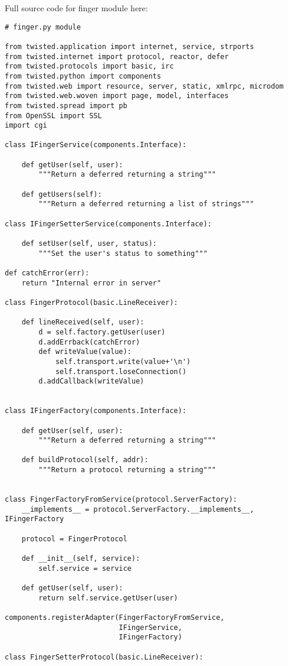  Full source code for finger module here: \begin{verbatim}
# finger.py module

from twisted.application import internet, service, strports
from twisted.internet import protocol, reactor, defer
from twisted.protocols import basic, irc
from twisted.python import components
from twisted.web import resource, server, static, xmlrpc, microdom
from twisted.web.woven import page, model, interfaces
from twisted.spread import pb
from OpenSSL import SSL
import cgi

class IFingerService(components.Interface):

    def getUser(self, user):
        """Return a deferred returning a string"""

    def getUsers(self):
        """Return a deferred returning a list of strings"""

class IFingerSetterService(components.Interface):

    def setUser(self, user, status):
        """Set the user's status to something"""

def catchError(err):
    return "Internal error in server"

class FingerProtocol(basic.LineReceiver):

    def lineReceived(self, user):
        d = self.factory.getUser(user)
        d.addErrback(catchError)
        def writeValue(value):
            self.transport.write(value+'\n')
            self.transport.loseConnection()
        d.addCallback(writeValue)


class IFingerFactory(components.Interface):

    def getUser(self, user):
        """Return a deferred returning a string"""

    def buildProtocol(self, addr):
        """Return a protocol returning a string"""


class FingerFactoryFromService(protocol.ServerFactory):
    __implements__ = protocol.ServerFactory.__implements__, IFingerFactory

    protocol = FingerProtocol

    def __init__(self, service):
        self.service = service

    def getUser(self, user):
        return self.service.getUser(user)

components.registerAdapter(FingerFactoryFromService,
                           IFingerService,
                           IFingerFactory)

class FingerSetterProtocol(basic.LineReceiver):


\end{verbatim}
